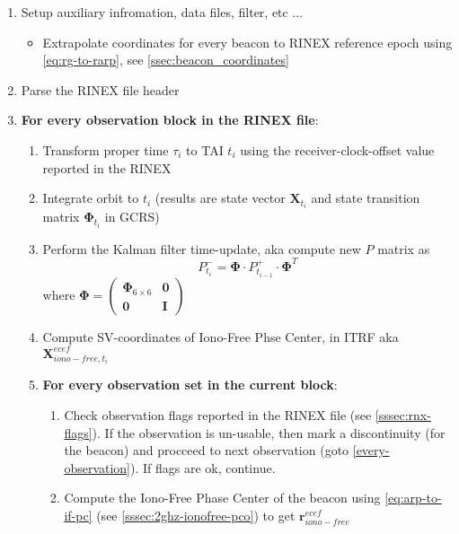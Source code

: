 \begin{enumerate}
  \item Setup auxiliary infromation, data files, filter, etc ...
  \begin{itemize}
    \item Extrapolate coordinates for every beacon to RINEX reference epoch using \ref{eq:rg-to-rarp}, see \ref{ssec:beacon_coordinates}
  \end{itemize}

  \item Parse the RINEX file header

  \item \textbf{For every observation block in the RINEX file}:
    \begin{enumerate}\label{every-block}
      \item Transform proper time $\tau _i$ to TAI $t_i$ using the receiver-clock-offset 
        value reported in the RINEX
      \item Integrate orbit to $t_i$ (results are state vector $\bm{X}_{t_i}$ and state 
        transition matrix $\bm{\Phi}_{t_i}$ in GCRS)
      \item Perform the Kalman filter time-update, aka compute new $P$ matrix as 
        \begin{equation}
          P^- _{t_i} = \bm{\Phi} \cdot P^+ _{t_{i-1}} \cdot \bm{\Phi}^T
        \end{equation}
        where $\bm{\Phi} = \begin{pmatrix} \bm{\Phi}_{6\times 6} & \bm{0} \\ \bm{0} & \bm{I} \end{pmatrix}$
        \item Compute SV-coordinates of Iono-Free Phse Center, in ITRF aka $\bm{X}^{ecef}_{iono-free,t_i}$
        \item \textbf{For every observation set in the current block}:
          \begin{enumerate}\label{every-observation}
            \item Check observation flags reported in the RINEX file (see \ref{sssec:rnx-flags}). 
              If the observation is un-usable, then mark a discontinuity (for the beacon) and procceed 
              to next observation (goto \ref{every-observation}). If flags are ok, continue.
            \item Compute the Iono-Free Phase Center of the beacon using \ref{eq:arp-to-if-pc} 
              (see \ref{sssec:2ghz-ionofree-pco}) to get $\bm{r}^{ecef}_{iono-free}$

\end{enumerate}
\end{enumerate}
\end{enumerate}
